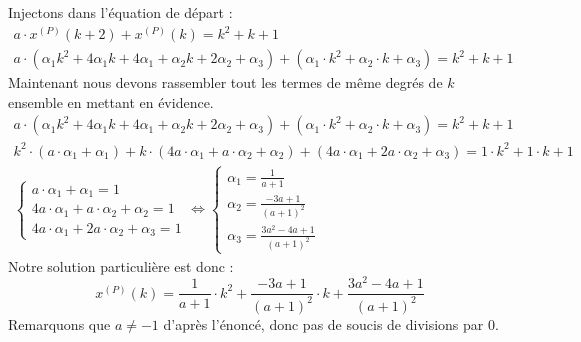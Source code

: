 \documentclass[11pt,a4paper]{report}
\begin{document}
			Injectons dans l'équation de départ :
			\begin{gather*} 
				a \cdot x^{(P)}(k+2) + x^{(P)}(k) = k^2 + k + 1\\
				a \cdot (\alpha_1 k^2 + 4\alpha_1k + 4\alpha_1 + \alpha_2 k + 2\alpha_2 + \alpha_3) + (\alpha_1 \cdot k^2 + \alpha_2 \cdot k + \alpha_3) = k^2 + k + 1
			\end{gather*}
			Maintenant nous devons rassembler tout les termes de même degrés de $k$ ensemble en mettant en évidence.
			\begin{gather*} 
				a \cdot (\alpha_1 k^2 + 4\alpha_1k + 4\alpha_1 + \alpha_2 k + 2\alpha_2 + \alpha_3) + (\alpha_1 \cdot k^2 + \alpha_2 \cdot k + \alpha_3) = k^2 + k + 1\\
				k^2 \cdot (a \cdot \alpha_1 + \alpha_1) + k \cdot (4 a \cdot \alpha_1 + a \cdot \alpha_2 + \alpha_2) + (4a \cdot \alpha_1  + 2 a\cdot \alpha_2 + \alpha_3) = 1 \cdot k^2 + 1 \cdot k + 1 \\
				\begin{cases} 
					a \cdot \alpha_1 + \alpha_1 = 1\\ 
					4 a \cdot \alpha_1 + a \cdot \alpha_2 + \alpha_2 = 1 \\
					4a \cdot \alpha_1  + 2 a\cdot \alpha_2 + \alpha_3 = 1
				\end{cases} \Leftrightarrow
				\begin{cases} 
					\alpha_1 = \frac{1}{a+1}\\ 
					\alpha_2 = \frac{-3a + 1}{(a+1)^2} \\
					\alpha_3 = \frac{3a^2-4a+1}{(a+1)^2}
				\end{cases}
			\end{gather*}
			Notre solution particulière est donc : 
			\[
				x^{(P)}(k) = \frac{1}{a+1} \cdot k^2 + \frac{-3a + 1}{(a+1)^2} \cdot k + \frac{3a^2-4a+1}{(a+1)^2}
			\]
			Remarquons que $a \neq -1$ d'après l'énoncé, donc pas de soucis de divisions par 0.
		
\end{document}
